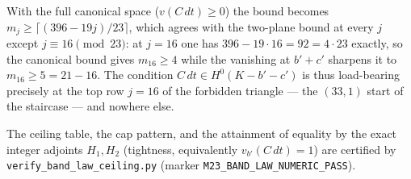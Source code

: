 \begin{remark}
With the full canonical space ($v(C\,dt)\ge 0$) the bound becomes
$m_j\ge\lceil(396-19j)/23\rceil$, which agrees with the two-plane bound
at every $j$ except $j\equiv 16\pmod{23}$: at $j=16$ one has
$396-19\cdot16=92=4\cdot 23$ exactly, so the canonical bound gives
$m_{16}\ge 4$ while the vanishing at $b'+c'$ sharpens it to
$m_{16}\ge 5=21-16$. The condition $C\,dt\in H^{0}(K-b'-c')$ is thus
load-bearing precisely at the top row $j=16$ of the forbidden triangle
--- the $(33,1)$ start of the staircase --- and nowhere else.
\end{remark}

\begin{remark}
The ceiling table, the cap pattern, and the attainment of equality by
the exact integer adjoints $H_1,H_2$ (tightness, equivalently
$v_{b'}(C\,dt)=1$) are certified by
\texttt{verify\_band\_law\_ceiling.py}
(marker \texttt{M23\_BAND\_LAW\_NUMERIC\_PASS}).
\end{remark}
